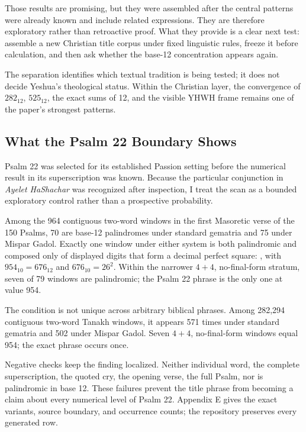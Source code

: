 Those results are promising, but they were assembled after the central patterns were already known and include related expressions. They are therefore exploratory rather than retroactive proof. What they provide is a clear next test: assemble a new Christian title corpus under fixed linguistic rules, freeze it before calculation, and then ask whether the base-12 concentration appears again.

The separation identifies which textual tradition is being tested; it does not decide Yeshua's theological status. Within the Christian layer, the convergence of $282_{12}$, $525_{12}$, the exact sums of 12, and the visible YHWH frame remains one of the paper's strongest patterns.

\subsection{What the Psalm 22 Boundary Shows}

Psalm 22 was selected for its established Passion setting before the numerical result in its superscription was known. Because the particular conjunction in \textit{Ayelet HaShachar} was recognized after inspection, I treat the scan as a bounded exploratory control rather than a prospective probability.

Among the 964 contiguous two-word windows in the first Masoretic verse of the 150 Psalms, 70 are base-12 palindromes under standard gematria and 75 under Mispar Gadol. Exactly one window under either system is both palindromic and composed only of displayed digits that form a decimal perfect square: , with $954_{10}=676_{12}$ and $676_{10}=26^2$. Within the narrower $4+4$, no-final-form stratum, seven of 79 windows are palindromic; the Psalm 22 phrase is the only one at value 954.

The condition is not unique across arbitrary biblical phrases. Among 282,294 contiguous two-word Tanakh windows, it appears 571 times under standard gematria and 502 under Mispar Gadol. Seven $4+4$, no-final-form windows equal 954; the exact phrase  occurs once.

Negative checks keep the finding localized. Neither individual word, the complete superscription, the quoted cry, the opening verse, the full Psalm, nor  is palindromic in base 12. These failures prevent the title phrase from becoming a claim about every numerical level of Psalm 22. Appendix E gives the exact variants, source boundary, and occurrence counts; the repository preserves every generated row.

